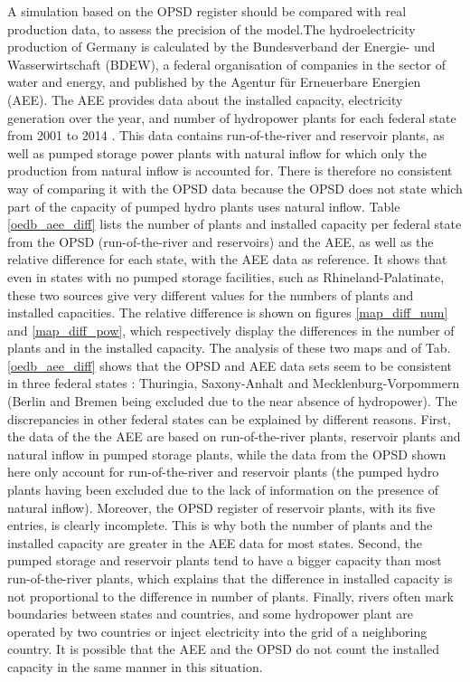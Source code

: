 A simulation based on the OPSD register should be compared with real production data, to assess the precision of the model.\newline The hydroelectricity production of Germany is calculated by the Bundesverband der Energie- und Wasserwirtschaft (BDEW), a federal organisation of companies in the sector of water and energy, and published by the Agentur für Erneuerbare Energien (AEE). The AEE provides data about the installed capacity, electricity generation over the year, and number of hydropower plants for each federal state from 2001 to 2014 \cite{aee}. This data contains run-of-the-river and reservoir plants, as well as pumped storage power plants with natural inflow for which only the production from natural inflow is accounted for. There is therefore no consistent way of comparing it with the OPSD data because the OPSD does not state which part of the capacity of pumped hydro plants uses natural inflow. \newline
Table \ref{oedb_aee_diff} lists the number of plants and installed capacity per federal state from the OPSD (run-of-the-river and reservoirs) and the AEE, as well as the relative difference for each state, with the AEE data as reference. It shows that even in states with no pumped storage facilities, such as Rhineland-Palatinate, these two sources give very different values for the numbers of plants and installed capacities. \newline
The relative difference is shown on figures \ref{map_diff_num} and \ref{map_diff_pow}, which respectively display the differences in the number of plants and in the installed capacity. The analysis of these two maps and of Tab. \ref{oedb_aee_diff} shows that the OPSD and AEE data sets seem to be consistent in three federal states : Thuringia, Saxony-Anhalt and Mecklenburg-Vorpommern (Berlin and Bremen being excluded due to the near absence of hydropower). The discrepancies in other federal states can be explained by different reasons. First, the data of the the AEE are based on run-of-the-river plants, reservoir plants and natural inflow in pumped storage plants, while the data from the OPSD shown here only account for run-of-the-river and reservoir plants (the pumped hydro plants having been excluded due to the lack of information on the presence of natural inflow). Moreover, the OPSD register of reservoir plants, with its five entries, is clearly incomplete. This is why both the number of plants and the installed capacity are greater in the AEE data for most states. Second, the pumped storage and reservoir plants tend to have a bigger capacity than most run-of-the-river plants, which explains that the difference in installed capacity is not proportional to the difference in number of plants. Finally, rivers often mark boundaries between states and countries, and some hydropower plant are operated by two countries or inject electricity into the grid of a neighboring country. It is possible that the AEE and the OPSD do not count the installed capacity in the same manner in this situation.

